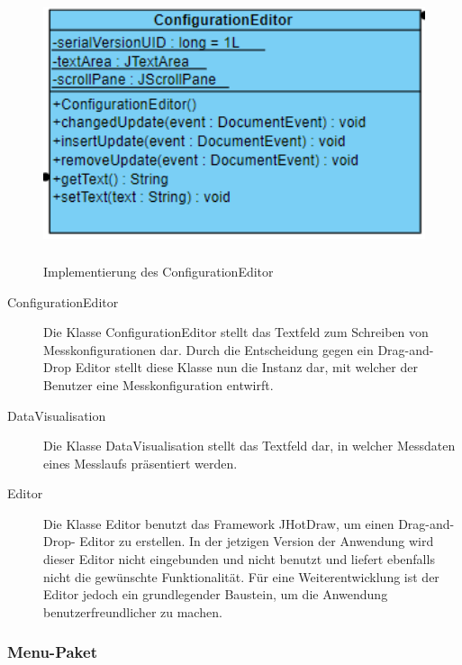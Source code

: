 \documentclass[parskip=full]{scrartcl}
\begin{document}
\begin{figure}[htbp]
    \begin{center}
        \includegraphics[height = 8cm]{Grafiken/ConfigurationEditor.png}
        \caption{Implementierung des ConfigurationEditor}
        \label{configEditor}
    \end{center}
\end{figure}


\begin{description}
\item[ConfigurationEditor] Die Klasse ConfigurationEditor stellt das Textfeld zum Schreiben von Messkonfigurationen dar. Durch die Entscheidung gegen ein Drag-and-Drop Editor stellt diese Klasse nun die Instanz dar, mit welcher der Benutzer eine Messkonfiguration entwirft.
\item[DataVisualisation] Die Klasse DataVisualisation stellt das Textfeld dar, in welcher Messdaten eines Messlaufs präsentiert werden.
\item[Editor] Die Klasse Editor benutzt das Framework JHotDraw, um einen Drag-and-Drop- Editor zu erstellen. In der jetzigen Version der Anwendung wird dieser Editor nicht eingebunden und nicht benutzt und liefert ebenfalls nicht die gewünschte Funktionalität. Für eine Weiterentwicklung ist der Editor jedoch ein grundlegender Baustein, um die Anwendung benutzerfreundlicher zu machen.

\end{description}


\subsubsection{Menu-Paket}
\end{document}
